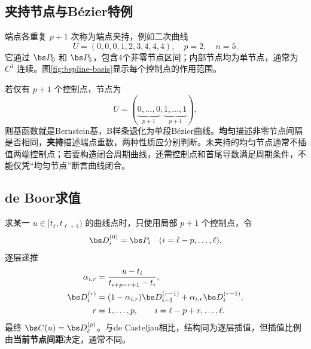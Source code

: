 
\subsection{夹持节点与Bézier特例}
端点各重复 $p+1$ 次称为端点夹持，例如二次曲线
\[
 U=(0,0,0,1,2,3,4,4,4),\quad p=2,\quad n=5.
\]
它通过 $\bs P_0$ 和 $\bs P_5$，包含4个非零节点区间；内部节点均为单节点，通常为 $C^1$ 连续。图\ref{fig:bspline-basis}显示每个控制点的作用范围。


若仅有 $p+1$ 个控制点，节点为
\[
 U=(\underbrace{0,\ldots,0}_{p+1},\underbrace{1,\ldots,1}_{p+1}),
\]
则基函数就是Bernstein基，B样条退化为单段Bézier曲线。\textbf{均匀}描述非零节点间隔是否相同，\textbf{夹持}描述端点重数，两种性质应分别判断。未夹持的均匀节点通常不插值两端控制点；若要构造闭合周期曲线，还需控制点和首尾导数满足周期条件，不能仅凭“均匀节点”断言曲线闭合。

\subsection{de Boor求值}
求某一 $u\in[t_\ell,t_{\ell+1})$ 的曲线点时，只使用局部 $p+1$ 个控制点，令
\[
 \bs D_i^{(0)}=\bs P_i\quad(i=\ell-p,\ldots,\ell).
\]
逐层递推
\begin{align*}
 \alpha_{i,r}&=\frac{u-t_i}{t_{i+p-r+1}-t_i},\\
 \bs D_i^{(r)}&=(1-\alpha_{i,r})\bs D_{i-1}^{(r-1)}
                 +\alpha_{i,r}\bs D_i^{(r-1)},\\
 r&=1,\ldots,p,\qquad i=\ell-p+r,\ldots,\ell.
\end{align*}
最终 $\bs C(u)=\bs D_\ell^{(p)}$。与de Casteljau相比，结构同为逐层插值，但插值比例由\textbf{当前节点间距}决定，通常不同。

\ex{讲义节点向量上的 $u=2.5$}{取 $p=2$ 和上面的 $U$，$u=2.5\in[t_4,t_5)$，所以 $\ell=4$，仅用 $\bs P_2,\bs P_3,\bs P_4$。
\begin{align*}
 \bs D_3^{(1)}&=\tfrac14\bs P_2+\tfrac34\bs P_3,\\
 \bs D_4^{(1)}&=\tfrac34\bs P_3+\tfrac14\bs P_4,\\
 \bs C(2.5)&=\tfrac12\bs D_3^{(1)}+\tfrac12\bs D_4^{(1)}
             =\tfrac18\bs P_2+\tfrac34\bs P_3+\tfrac18\bs P_4.
\end{align*}
系数非负且和为1，可作为快速检验。若再取 $\bs P_2=(0,0),\bs P_3=(2,2),\bs P_4=(4,0)$，则得到 $(2,1.5)$。}

